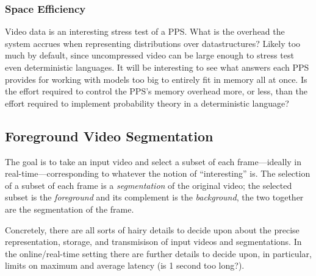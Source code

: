 \subsubsection{Space Efficiency}

Video data is an interesting stress test of a PPS.  What is the
overhead the system accrues when representing distributions over
datastructures?  Likely too much by default, since uncompressed video
can be large
enough to stress test even deterministic languages.  It will be
interesting to see what answers each PPS provides for working with
models too big to entirely fit in memory all at once.  Is the effort
required to control the PPS's memory overhead more, or less, than the
effort required to implement probability theory in a deterministic
language?










\subsection{Foreground Video Segmentation}
\label{sec:formal-problem}

The goal is to take an input video and select a subset of each
frame---ideally in real-time---corresponding to whatever the notion of
``interesting'' is.  The selection of a subset of each frame is a
\emph{segmentation} of the original video; the selected subset is the
\emph{foreground} and its complement is the \emph{background}, the two
together are the segmentation of the frame.

Concretely, there are all sorts of hairy details to decide upon about the
precise representation, storage, and transmisison of input videos and
segmentations. In the online/real-time setting there are further details to
decide upon, in particular, limits on maximum 
and average latency (is 1 second too long?).


